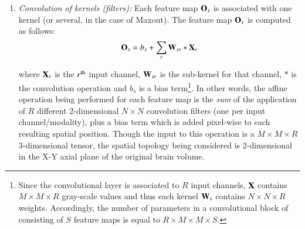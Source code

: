 \documentclass[final,5p,times,twocolumn]{elsarticle}
\begin{document}
\begin{enumerate}

\item {\it Convolution of kernels (filters):} Each feature map ${\bf O}_s$ is associated with one kernel (or several, in the case of Maxout). %
The feature map ${\bf O}_s$ is computed as follows:
%
\begin{equation}\label{eq:conv}
{\bf O}_s = b_s + \sum_r {\bf W}_{sr} \ast {\bf X}_r
\end{equation}


where ${\bf X}_r$ is the $r^{\rm th}$ input channel, ${\bf W}_{sr}$ is the sub-kernel for that channel, $\ast$ is the convolution operation and $b_s$ is a bias term\footnote{Since the convolutional layer is associated to $R$ input channels, ${\bf X}$ contains $M\times M\times R$ gray-scale values and thus each kernel  ${\bf W}_{s}$ contains $N\times N\times R$ weights. Accordingly, the number of parameters in a convolutional block of consisting of $S$ feature maps is equal to $R\times M\times M\times S $.}. In other words, the affine operation being performed for each feature map is the \textit{sum} of the application of $R$ different 2-dimensional $N\times N$ convolution filters (one per input channel/modality), plus a bias term which is added pixel-wise to each resulting spatial position. Though the input to this operation is a $M \times M \times R$ 3-dimensional tensor, the spatial topology being considered is 2-dimensional in the X-Y axial plane of the original brain volume.



\end{enumerate}
\end{document}
